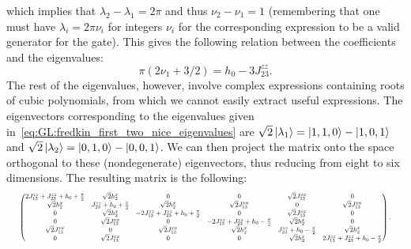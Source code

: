 which implies that $\lambda_2-\lambda_1= 2\pi$ and thus $\nu_2-\nu_1=1$ (remembering that one must have $\lambda_i=2\pi\nu_i$ for integers $\nu_i$ for the corresponding expression to be a valid generator for the gate).
This gives the following relation between the coefficients and the eigenvalues:
\begin{equation}
    \pi(2\nu_1 + 3/2) = h_0 - 3 J_{23}^{zz}.
    \label{eq:GL:fredkin_condition_between_h0_and_J23zz}
\end{equation}
The rest of the eigenvalues, however, involve complex expressions containing roots of cubic polynomials, from which we cannot easily extract useful expressions.
The eigenvectors corresponding to the eigenvalues given in~\cref{eq:GL:fredkin_first_two_nice_eigenvalues} are
$\sqrt2\ket{\lambda_1} = \ket{1,1,0} - \ket{1,0,1}$
and
$\sqrt2\ket{\lambda_2} = \ket{0,1,0} - \ket{0,0,1}$.
We can then project the matrix onto the space orthogonal to these (nondegenerate) eigenvectors, thus reducing from eight to six dimensions. The resulting matrix is the following:
\begin{equation}\scalebox{0.6}{$%
\begin{pmatrix}
	2 J_{13}^{zz} + J_{23}^{zz} + h_{0} + \frac{\pi }{2} & \sqrt{2} h_{2}^{x} & 0 & 0 & \sqrt{2} J_{13}^{xx} & 0 \\
	\sqrt{2} h_{2}^{x} & J_{23}^{zz} + h_{0} + \frac{\pi }{2} & \sqrt{2} h_{2}^{x} & \sqrt{2} J_{13}^{xx} & 0 & \sqrt{2} J_{13}^{xx} \\
	0 & \sqrt{2} h_{2}^{x} & -2 J_{13}^{zz} + J_{23}^{zz} + h_{0} + \frac{\pi }{2} & 0 & \sqrt{2} J_{13}^{xx} & 0 \\
	0 & \sqrt{2} J_{13}^{xx} & 0 & -2 J_{13}^{zz} + J_{23}^{zz} + h_{0}-\frac{\pi }{2} & \sqrt{2} h_{2}^{x} & 0 \\
	\sqrt{2} J_{13}^{xx} & 0 & \sqrt{2} J_{13}^{xx} & \sqrt{2} h_{2}^{x} & J_{23}^{zz} + h_{0}-\frac{\pi }{2} & \sqrt{2} h_{2}^{x} \\
	0 & \sqrt{2} J_{13}^{xx} & 0 & 0 & \sqrt{2} h_{2}^{x} & 2 J_{13}^{zz} + J_{23}^{zz} + h_{0}-\frac{\pi }{2} \\
\end{pmatrix}.$}
\end{equation}
